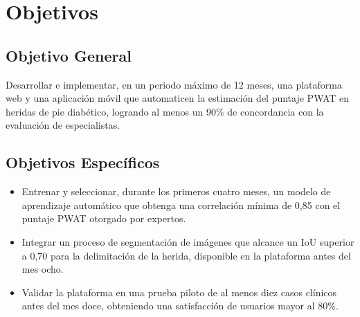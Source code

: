 \section{Objetivos}

\subsection{Objetivo General}
\label{sc:OG}
Desarrollar e implementar, en un periodo máximo de 12 meses, una plataforma web y una aplicación móvil que automaticen la estimación del puntaje PWAT en heridas de pie diabético, logrando al menos un 90\% de concordancia con la evaluación de especialistas.

\subsection{Objetivos Específicos}
\label{ssc:OE}

\begin{itemize}
    \item Entrenar y seleccionar, durante los primeros cuatro meses, un modelo de aprendizaje automático que obtenga una correlación mínima de 0,85 con el puntaje PWAT otorgado por expertos.
    \item Integrar un proceso de segmentación de imágenes que alcance un IoU superior a 0,70 para la delimitación de la herida, disponible en la plataforma antes del mes ocho.
    \item Validar la plataforma en una prueba piloto de al menos diez casos clínicos antes del mes doce, obteniendo una satisfacción de usuarios mayor al 80\%.
\end{itemize}
